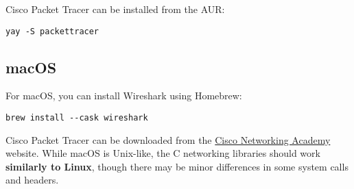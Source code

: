 Cisco Packet Tracer can be installed from the AUR:
\begin{verbatim}
yay -S packettracer
\end{verbatim}

\subsection{macOS}
For macOS, you can install Wireshark using Homebrew:
\begin{verbatim}
brew install --cask wireshark
\end{verbatim}

Cisco Packet Tracer can be downloaded from the \href{https://www.netacad.com/courses/packet-tracer}{Cisco Networking Academy} website. While macOS is Unix-like, the C networking libraries should work \textbf{similarly to Linux}, though there may be minor differences in some system calls and headers.